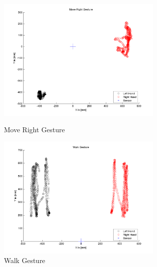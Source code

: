 \begin{figure}
\begin{minipage}
		{.45 
		\textwidth}  
		\centering
		\includegraphics[height=60mm]{figures/result/train-move-right.png} \caption*{Move Right Gesture} 
	\end{minipage}
	\begin{minipage}
		{.45 
		\textwidth}  
		\centering
		\includegraphics[height=60mm]{figures/result/train-walk.png} \caption*{Walk Gesture} 
	\end{minipage}	
\end{figure}
\label{fg:ges:plot}

